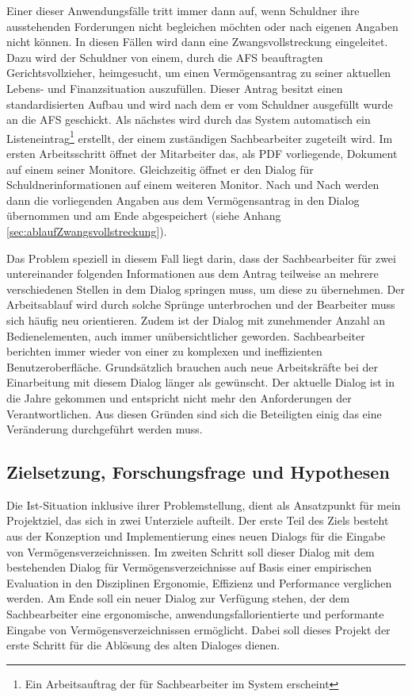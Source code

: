 Einer dieser Anwendungsfälle tritt immer dann auf, wenn Schuldner ihre ausstehenden Forderungen nicht begleichen möchten oder nach eigenen Angaben nicht können. In diesen Fällen wird dann eine Zwangsvollstreckung eingeleitet. Dazu wird der Schuldner von einem, durch die \gls{AFS} beauftragten Gerichtsvollzieher, heimgesucht, um einen Vermögensantrag zu seiner aktuellen Lebens- und Finanzsituation auszufüllen. Dieser Antrag besitzt einen standardisierten Aufbau und wird nach dem er vom Schuldner ausgefüllt wurde an die \gls{AFS} geschickt. Als nächstes wird durch das System automatisch ein Listeneintrag\footnote{Ein Arbeitsauftrag der für Sachbearbeiter im System erscheint} erstellt, der einem zuständigen Sachbearbeiter zugeteilt wird. Im ersten Arbeitsschritt öffnet der Mitarbeiter das, als PDF vorliegende, Dokument auf einem seiner Monitore. Gleichzeitig öffnet er den Dialog für Schuldnerinformationen auf einem weiteren Monitor. Nach und Nach werden dann die vorliegenden Angaben aus dem Vermögensantrag in den Dialog übernommen und am Ende abgespeichert (siehe
Anhang \ref{sec:ablaufZwangsvollstreckung}).

Das Problem speziell in diesem Fall liegt darin, dass der Sachbearbeiter für zwei untereinander folgenden Informationen aus dem Antrag teilweise an mehrere verschiedenen Stellen in dem Dialog springen muss, um diese zu übernehmen. Der Arbeitsablauf wird durch solche Sprünge unterbrochen und der Bearbeiter muss sich häufig neu orientieren. Zudem ist der Dialog mit zunehmender Anzahl an Bedienelementen, auch immer unübersichtlicher geworden. Sachbearbeiter berichten immer wieder von einer zu komplexen und ineffizienten Benutzeroberfläche. Grundsätzlich brauchen auch neue Arbeitskräfte bei der Einarbeitung mit diesem Dialog länger als gewünscht. Der aktuelle Dialog ist in die Jahre gekommen und entspricht nicht mehr den Anforderungen der Verantwortlichen. Aus diesen Gründen sind sich die Beteiligten einig das eine Veränderung durchgeführt werden muss.


\subsection{Zielsetzung, Forschungsfrage und Hypothesen}
Die Ist-Situation inklusive ihrer Problemstellung, dient als Ansatzpunkt für mein Projektziel, das sich in zwei Unterziele aufteilt. Der erste Teil des Ziels besteht aus der Konzeption und Implementierung eines neuen Dialogs für die Eingabe von Vermögensverzeichnissen. Im zweiten Schritt soll dieser Dialog mit dem bestehenden Dialog für Vermögensverzeichnisse auf Basis einer empirischen Evaluation in den Disziplinen Ergonomie, Effizienz und Performance verglichen werden. Am Ende soll ein neuer Dialog zur Verfügung stehen, der dem Sachbearbeiter eine ergonomische, anwendungsfallorientierte und performante Eingabe von Vermögensverzeichnissen ermöglicht. Dabei soll dieses Projekt der erste Schritt für die Ablösung des alten Dialoges dienen. 

